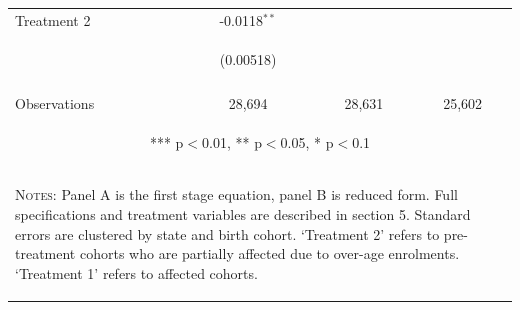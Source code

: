 \documentclass[10pt,letterpaper,subeqn, xcolor=table]{beamer}
\begin{document}
{\begin{table}[htpb!]
\begin{center}
{\begin{tabular}{lccc}
Treatment 2 & -0.0118$^{**}$&& \\
& \begin{footnotesize} (0.00518) \end{footnotesize} && \\
& & & \\
Observations & 28,694 &  28,631 & 25,602 \\ \bottomrule
        \multicolumn{4}{c}{\begin{footnotesize} *** p$<$0.01, ** p$<$0.05, * p$<$0.1\end{footnotesize}} \\
        \multicolumn{4}{p{9cm}}{\begin{footnotesize}\textsc{Notes:} Panel A is the first stage equation, panel B is reduced form. Full specifications and treatment variables are described in section 5.  Standard errors are clustered by state and birth cohort. `Treatment 2' refers to pre-treatment cohorts who are partially affected due to over-age enrolments. `Treatment 1' refers to affected cohorts. \end{footnotesize}} \\ \midrule

\end{tabular}
}
\end{center}
\end{table}
}

\end{document}
